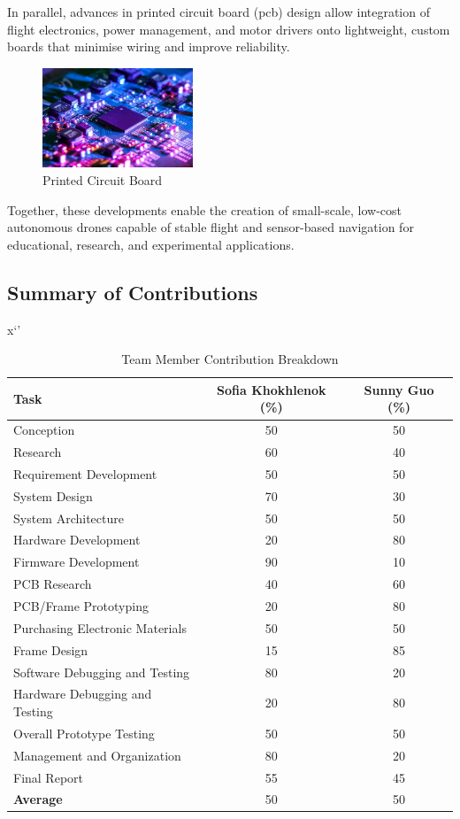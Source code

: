In parallel, advances in printed circuit board (\gls{pcb}) design allow integration of flight electronics, power management, and motor drivers onto lightweight, custom boards that minimise wiring and improve reliability. 

\begin{figure}[H]
    \centering
    \captionsetup{justification=centering, margin=1cm}
    \includegraphics[width=0.4\textwidth]{img/intro-pcb.PNG}
    \caption{Printed Circuit Board \cite{mistral2020}}
\end{figure}

Together, these developments enable the creation of small-scale, low-cost autonomous drones capable of stable flight and sensor-based navigation for educational, research, and experimental applications.

\subsection{Summary of Contributions}
x`'
\begin{table}[H]
\centering
\caption{Team Member Contribution Breakdown}
\renewcommand{\arraystretch}{1.2}
\begin{tabular}{@{}lcc@{}}
\toprule
\textbf{Task} & \textbf{Sofia Khokhlenok (\%)} & \textbf{Sunny Guo (\%)} \\ 
\midrule
Conception & 50 & 50 \\
Research & 60 & 40 \\
Requirement Development & 50 & 50 \\
System Design & 70 & 30 \\
System Architecture & 50 & 50 \\
Hardware Development & 20 & 80 \\
Firmware Development & 90 & 10 \\
PCB Research & 40 & 60 \\
PCB/Frame Prototyping & 20 & 80 \\
Purchasing Electronic Materials & 50 & 50 \\
Frame Design & 15 & 85 \\
Software Debugging and Testing & 80 & 20 \\
Hardware Debugging and Testing & 20 & 80 \\
Overall Prototype Testing & 50 & 50 \\
Management and Organization & 80 & 20 \\
Final Report & 55 & 45 \\
\textbf{Average} & 50 & 50 \\
\bottomrule
\end{tabular}
\end{table}

